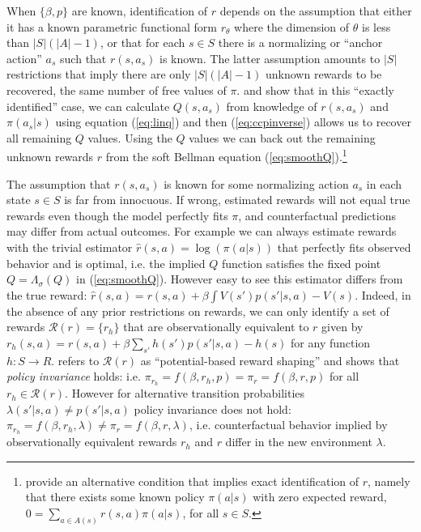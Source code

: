 When  $\{\beta,p\}$ are known, identification of $r$ depends on the assumption that either it has a known parametric
functional form $r_\theta$ where the dimension of $\theta$ 
is less than $|S|(|A|-1)$, or that for each $s \in S$ there is
a normalizing or ``anchor action'' $a_s$ such that  $r(s,a_s)$ is known. The latter assumption amounts to $|S|$ restrictions
that imply there are only $|S|(|A|-1)$ unknown rewards to be recovered, the same number of free values of $\pi$. 
\citet{hotzmiller:1993} and \citet{kang:2025} show that in this ``exactly identified'' case,
we can calculate $Q(s,a_s)$ from knowledge of $r(s,a_s)$ and $\pi(a_s|s)$ using equation (\ref{eq:linq}) 
and then (\ref{eq:ccpinverse}) allows us to recover all remaining $Q$ values. 
Using the $Q$ values we can back out the remaining unknown rewards $r$ from the soft Bellman equation (\ref{eq:smoothQ}).\footnote{\footnotesize 
\citet{eerl:2026} provide an alternative condition that implies exact identification of $r$, namely that there exists
some known policy $\pi(a|s)$ with zero expected reward, $0=\sum_{a \in A(s)} r(s,a)\pi(a|s)$, for all $s \in S$. }

The assumption that $r(s,a_s)$ is known for some normalizing action $a_s$ in each state $s \in S$ is far from innocuous. If wrong, estimated rewards will not equal true rewards even though the model perfectly fits $\pi$, and counterfactual predictions may differ from actual outcomes. 
For example we can always estimate rewards with the trivial estimator $\hat r(s,a)=\log(\pi(a|s))$ that perfectly fits
observed behavior and is optimal, i.e. the implied $Q$ function satisfies the fixed point $Q=\Lambda_\sigma(Q)$
in (\ref{eq:smoothQ}). However easy to see this estimator differs from the true reward: $\hat r(s,a)=r(s,a)+\beta \int V(s')p(s'|s,a)-V(s)$.
Indeed, in the absence of any prior restrictions on rewards, we can only identify a set of rewards 
$\mathcal{R}(r)=\{r_h\}$ that are observationally equivalent to $r$ given by $r_h(s,a)=r(s,a)+\beta \sum_{s'} h(s')p(s'|s,a)-h(s)$ for any function $h: S \to R$. 
\citet{nhr:1999} refers to  $\mathcal{R}(r)$ as ``potential-based reward shaping'' 
and shows that {\it policy invariance\/} holds: i.e.  $\pi_{r_h}=f(\beta,r_h,p)=\pi_r=f(\beta,r,p)$ for all
$r_h \in \mathcal{R}(r)$.  However for alternative transition probabilities $\lambda(s'|s,a)\ne p(s'|s,a)$ policy invariance
does not hold: $\pi_{r_h}=f(\beta,r_h,\lambda) \ne \pi_{r}=f(\beta,r,\lambda)$, i.e. counterfactual behavior 
implied by observationally equivalent rewards $r_h$ and $r$ differ in the new environment $\lambda$.

